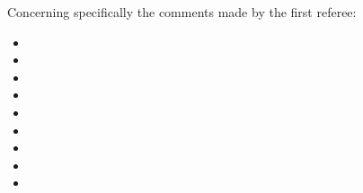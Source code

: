 \documentclass[11pt,a4paper,sans]{moderncv}        %
\begin{document}
\medskip


Concerning specifically the comments made by the first referee:

\begin{itemize}
	\item 
	
	\item 
	
	\item 
	
	\item 
	
	\item 
	
	\item 
	
	\item 
	
	\item 
	
	\item 
	

\end{itemize}
\end{document}
